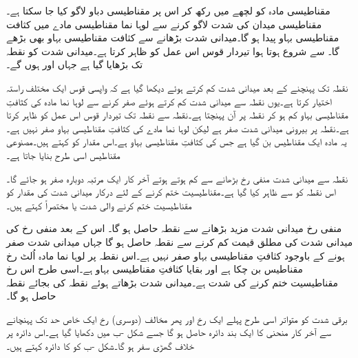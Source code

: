 مقناطیسی مادہ کو لچھے میں رکھ کر اس پر مقناطیسی دباو لاگو کیا جا سکتا ہے۔ مقناطیسی میدان کی شدت   لاگو کرنے سے لوہا نما مقناطیسی مادے میں کثافت مقناطیسی بہاو   پیدا ہو گا۔میدانی شدت بڑھانے سے کثافت مقناطیسی بہاو بھی بڑھے گا۔  سے شروع ہوتا ہوا   تیردار قوس اس عمل کو ظاہر کرتا ہے۔میدانی شدت کو نقطہ   تک بڑھایا گیا ہے جہاں   اور  ہوں گے۔


نقطہ  تک پہنچنے کے بعد میدانی شدت کم کرتے ہوئے دیکھا گیا ہے کہ واپسی  قوس ایک مختلف راستہ اختیار کرتا ہے۔یوں نقطہ   سے میدانی شدت کم کرتے ہوئے صفر کرنے سے  لوہا نما مادہ کی کثافتِ مقناطیسی بہاو کم ہو کر نقطہ  پر آن پہنچتا ہے۔نقطہ  سے نقطہ  تک تیردار قوس اس عمل کو ظاہر کرتا ہے۔نقطہ  پر بیرونی میدانی شدت صفر ہے لیکن لوہا نما مادے کی کثافتِ مقناطیسی بہاو صفر نہیں ہے۔یہ مادہ ایک مقناطیس بن گیا ہے جس کی کثافتِ مقناطیسی بہاو   ہے۔اس مقدار کو   کہتے ہیں۔مصنوعی مقناطیس اسی طرح بنایا جاتا ہے۔

نقطہ  سے میدانی شدت منفی رخ  بڑھانے سے   کم ہوتے ہوتے آخر کار ایک مرتبہ دوبارہ صفر ہو جائے گا۔اس نقطہ کو  سے ظاہر کیا گیا ہے۔مقناطیسیت ختم کرنے کے لئے درکار میدانی شدت کی مقدار   کو مقناطیسیت ختم کرنے والی شدت یا مختصراً  کہتے ہیں۔

منفی رخ  میدانی شدت مزید بڑھانے سے  نقطہ  حاصل ہو گا۔ اس کے بعد منفی رخ  کی میدانی شدت کی مطلق قیمت کم کرنے سے  نقطہ  حاصل ہو گا جہاں میدانی شدت صفر ہونے کے باوجود کثافتِ مقناطیسی بہاو صفر نہیں ہے۔اس نقطہ پر لوہا نما مادہ اُلٹ رخ مقناطیس بن چکا ہے اور  بقایا کثافتِ مقناطیسی بہاو ہے۔اسی طرح اس رخ مقناطیسیت ختم کرنے کی شدت  ہے۔میدانی شدت بڑھاتے ہوئے نقطہ  کی بجائے   نقطہ  حاصل ہو گا۔

برقی شدت کو متواتر اسی طرح پہلے ایک رخ اور پھر مخالف (دوسری) رخ  ایک خاص حد تک پہنچانے سے  آخر کار   منحنی کا ایک بند دائرہ حاصل ہو گا جسے شکل -ب میں دکھایا گیا ہے۔اس دائرہ پر خلاف گھڑی سفر ہو گا۔شکل -ب کو   کا دائرہ  کہتے ہیں۔

